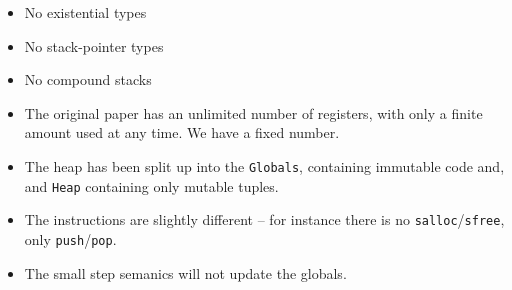 \begin{itemize}
\item No existential types
\item No stack-pointer types
\item No compound stacks
\item The original paper has an unlimited number of registers, with only a
  finite amount used at any time. We have a fixed number.
\item The heap has been split up into the \texttt{Globals}, containing immutable
  code and, and \texttt{Heap} containing only mutable tuples.
\item The instructions are slightly different -- for instance there is no \texttt{salloc}/\texttt{sfree}, only \texttt{push}/\texttt{pop}.
\item The small step semanics will not update the globals.
\end{itemize}
